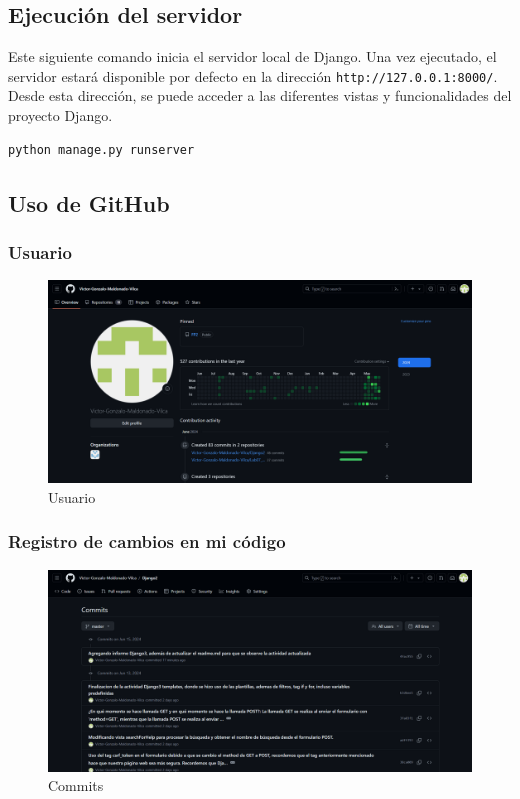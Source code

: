 \documentclass{article}
\begin{document}

  \subsection{Ejecución del servidor}
  Este siguiente comando inicia el servidor local de Django. Una vez ejecutado, el servidor estará disponible por defecto en la dirección 
  \texttt{http://127.0.0.1:8000/}. Desde esta dirección, se puede acceder a las diferentes vistas y funcionalidades del 
  proyecto Django.
  \begin{lstlisting}[language=bash]
    python manage.py runserver
  \end{lstlisting}
  

  \subsection{Uso de GitHub}
  

  \subsubsection{Usuario}
  \begin{figure}[H]
    \centering
    \includegraphics[width=1\textwidth, keepaspectratio]{img/usuario.png}
    \caption{Usuario}
  \end{figure}
  

  \subsubsection{Registro de cambios en mi código}
  \begin{figure}[H]
    \centering
    \includegraphics[width=1\textwidth, keepaspectratio]{img/commit.png}
    \caption{Commits}
  \end{figure}
  
\end{document}
